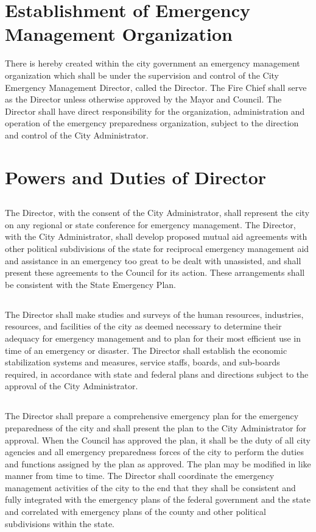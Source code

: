 \documentclass[code.tex]{subfiles}
\begin{document}
\section{Establishment of Emergency Management Organization}
There is hereby created within the city government an emergency management organization which shall be under the supervision and control of the City Emergency Management Director, called the Director. The Fire Chief shall serve as the Director unless otherwise approved by the Mayor and Council. The Director shall have direct responsibility for the organization, administration and operation of the emergency preparedness organization, subject to the direction and control of the City Administrator.

\section{Powers and Duties of Director}
\subsection{}
The Director, with the consent of the City Administrator, shall represent the city on any regional or state conference for emergency management. The Director, with the City Administrator, shall develop proposed mutual aid agreements with other political subdivisions of the state for reciprocal emergency management aid and assistance in an emergency too great to be dealt with unassisted, and shall present these agreements to the Council for its action.  These arrangements shall be consistent with the State Emergency Plan.
\subsection{}
The Director shall make studies and surveys of the human resources, industries, resources, and facilities of the city as deemed necessary to determine their adequacy for emergency management and to plan for their most efficient use in time of an emergency or disaster. The Director shall establish the economic stabilization systems and measures, service staffs, boards, and sub-boards required, in accordance with state and federal plans and directions subject to the approval of the City Administrator.
\subsection{}
The Director shall prepare a comprehensive emergency plan for the emergency preparedness of the city and shall present the plan to the City Administrator for approval.   When the Council has approved the plan, it shall be the duty of all city agencies and all emergency preparedness forces of the city to perform the duties and functions assigned by the plan as approved. The plan may be modified in like manner from time to time. The Director shall coordinate the emergency management activities of the city to the end that they shall be consistent and fully integrated with the emergency plans of the federal government and the state and correlated with emergency plans of the county and other political subdivisions within the state.
\end{document}
